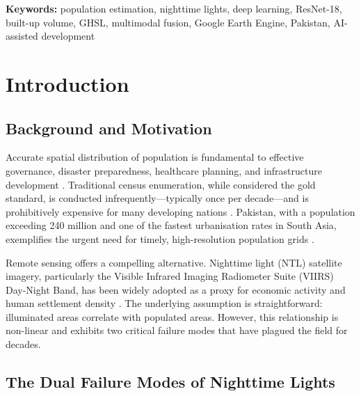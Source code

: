 \documentclass[12pt,a4paper]{article}
\begin{document}
\begin{titlepage}
    \vspace{0.5cm}
    \noindent\textbf{Keywords:} population estimation, nighttime lights, deep learning, ResNet-18, built-up volume, GHSL, multimodal fusion, Google Earth Engine, Pakistan, AI-assisted development
    
\end{titlepage}

\tableofcontents
\newpage

\section{Introduction}
\label{sec:introduction}

\subsection{Background and Motivation}
\label{subsec:background}

Accurate spatial distribution of population is fundamental to effective governance, disaster preparedness, healthcare planning, and infrastructure development \citep{tatem2017worldpop}. Traditional census enumeration, while considered the gold standard, is conducted infrequently---typically once per decade---and is prohibitively expensive for many developing nations \citep{wardrop2018spatially}. Pakistan, with a population exceeding 240 million and one of the fastest urbanisation rates in South Asia, exemplifies the urgent need for timely, high-resolution population grids \citep{pbs2023census}.

Remote sensing offers a compelling alternative. Nighttime light (NTL) satellite imagery, particularly the Visible Infrared Imaging Radiometer Suite (VIIRS) Day-Night Band, has been widely adopted as a proxy for economic activity and human settlement density \citep{elvidge2017overview}. The underlying assumption is straightforward: illuminated areas correlate with populated areas. However, this relationship is non-linear and exhibits two critical failure modes that have plagued the field for decades.

\subsection{The Dual Failure Modes of Nighttime Lights}
\label{subsec:problems}
\end{document}
